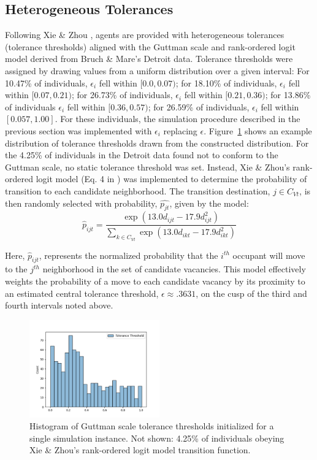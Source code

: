 \documentclass[a4paper]{article}
\begin{document}
\subsection{Heterogeneous Tolerances}
Following Xie \& Zhou \cite{xie2012modeling}, agents are provided with heterogeneous tolerances (tolerance thresholds) aligned with the Guttman scale and rank-ordered logit model derived from Bruch \& Mare’s \cite{BRUCHElizabethE2006Ncan} Detroit data. Tolerance thresholds were assigned by drawing values from a uniform distribution over a given interval: For 10.47\% of individuals, $\epsilon_i$ fell within $[0.0,0.07)$; for 18.10\% of individuals, $\epsilon_i$ fell within $[0.07,0.21)$; for 26.73\% of individuals, $\epsilon_i$ fell within $[0.21, 0.36)$; for 13.86\% of individuals $\epsilon_i$ fell within $[0.36,0.57)$; for 26.59\% of individuals, $\epsilon_i$ fell within $[0.057,1.00]$.  For these individuals, the simulation procedure described in the previous section was implemented with $\epsilon_i$ replacing $\epsilon$. Figure~\ref*{fig:fig_s3} shows an example distribution of tolerance thresholds drawn from the constructed distribution. For the 4.25\% of individuals in the Detroit data found not to conform to the Guttman scale, no static tolerance threshold was set. Instead, Xie \& Zhou’s rank-ordered logit model (Eq. 4 in \cite{xie2012modeling}) was implemented to determine the probability of transition to each candidate neighborhood.  The transition destination, $j\in C_{Vt}$, is then randomly selected with probability, $\widehat{p_{jt}}$, given by the model:
\begin{equation}
    \hat{p}_{ijt}=\frac{\exp{\left(13.0d_{ijt}-17.9d_{ijt}^2\right)}}{\sum_{k \in C_{Vt}}{\exp\left(13.0d_{ikt}-17.9d_{ikt}^2\right)}}
\end{equation}

Here, ${\hat{p}}_{ijt}$, represents the normalized probability that the $i^{th}$ occupant will move to the $j^{th}$ neighborhood in the set of candidate vacancies. This model effectively weights the probability of a move to each candidate vacancy by its proximity to an estimated central tolerance threshold, $\epsilon\approx.3631$, on the cusp of the third and fourth intervals noted above.  

\begin{figure}[H]
    \centering
    \includegraphics[width=0.5\textwidth]{figs3.png}
    \caption{Histogram of Guttman scale tolerance thresholds initialized for a single simulation instance. Not shown: 4.25\% of individuals obeying Xie \& Zhou’s rank-ordered logit model transition function.}
    \label{fig:fig_s3}
\end{figure}
\end{document}
